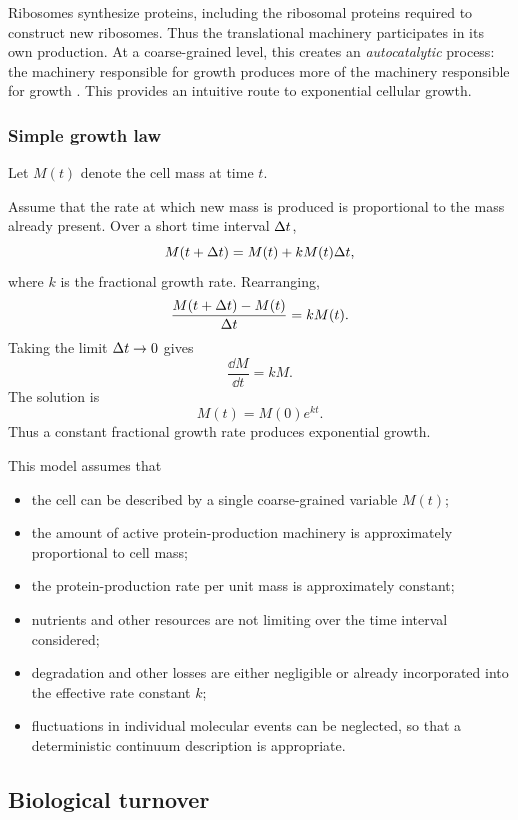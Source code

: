 Ribosomes synthesize proteins, including the ribosomal proteins required to construct new ribosomes.
Thus the translational machinery participates in its own production.
At a coarse-grained level, this creates an \emph{autocatalytic} process: the machinery responsible for growth produces more of the machinery responsible for growth \cite{roy2021unifying}.
This provides an intuitive route to exponential cellular growth.

\subsubsection*{Simple growth law}

Let $M(t)$ denote the cell mass at time $t$.

Assume that the rate at which new mass is produced is proportional to the mass already present. 
Over a short time interval $\Delta t$, 
\[
    M(t+\Delta t) = M(t) + kM(t)\Delta t,
\] 
where $k$ is the fractional growth rate. 
Rearranging, 
\[
    \frac{M(t+\Delta t)-M(t)}{\Delta t} = kM(t).
\] 
Taking the limit $\Delta t\rightarrow 0$ gives 
\[
    \frac{\dd M}{\dd t} = kM.
\] 
The solution is 
\[
    M(t) = M(0)e^{kt}.
\] 
Thus a constant fractional growth rate produces exponential growth.

This model assumes that

\begin{itemize}
    \item the cell can be described by a single coarse-grained variable $M(t)$;
    \item the amount of active protein-production machinery is
    approximately proportional to cell mass;
    \item the protein-production rate per unit mass is approximately
    constant;
    \item nutrients and other resources are not limiting over the time interval considered;
    \item degradation and other losses are either negligible or already incorporated into the effective rate constant $k$;
    \item fluctuations in individual molecular events can be neglected, so that a deterministic continuum description is appropriate.
\end{itemize}



\subsection{Biological turnover}
\label{sec:turnover}


